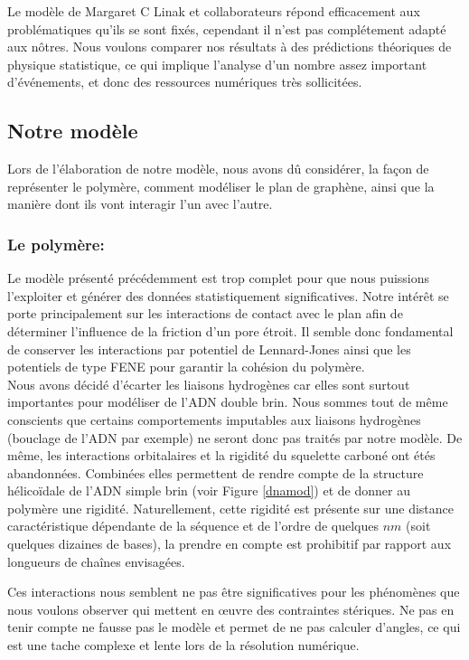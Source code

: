 \documentclass[a4paper,11pt]{article}
\begin{document}
Le modèle de Margaret C Linak et collaborateurs \cite{jchem} répond efficacement aux problématiques qu'ils se sont fixés, cependant il n'est pas complétement adapté aux nôtres. Nous voulons comparer nos résultats à des prédictions théoriques de physique statistique, ce qui implique l'analyse d'un nombre assez important d'événements, et donc des ressources numériques très sollicitées.\\

\subsection{Notre modèle}

Lors de l'élaboration de notre modèle, nous avons dû considérer, la façon de représenter le polymère, comment modéliser le plan de graphène, ainsi que la manière dont ils vont interagir l'un avec l'autre.

\subsubsection*{Le polymère:}

Le modèle présenté précédemment est trop complet pour que nous puissions l'exploiter et générer des données statistiquement significatives. Notre intérêt se porte principalement sur les interactions de contact avec le plan afin de déterminer l'influence de la friction d'un pore étroit. Il semble donc fondamental de conserver les interactions par potentiel de Lennard-Jones ainsi que les potentiels de type FENE pour garantir la cohésion du polymère.\\

Nous avons décidé d'écarter les liaisons hydrogènes car elles sont surtout importantes pour modéliser de l'ADN double brin. Nous sommes tout de même conscients que certains comportements imputables aux liaisons hydrogènes (bouclage de l'ADN par exemple) ne seront donc pas traités par notre modèle. De même, les interactions orbitalaires et la rigidité du squelette carboné ont étés abandonnées. Combinées elles permettent de rendre compte de la structure hélicoïdale de l'ADN simple brin (voir Figure \ref{dnamod}) et de donner au polymère une rigidité. Naturellement, cette rigidité est présente sur une distance caractéristique dépendante de la séquence et de l'ordre de quelques $nm$ (soit quelques dizaines de bases), la prendre en compte est prohibitif par rapport aux longueurs de chaînes envisagées.

Ces interactions nous semblent ne pas être significatives pour les phénomènes que nous voulons observer qui mettent en œuvre des contraintes stériques. Ne pas en tenir compte ne fausse pas le modèle et permet de ne pas calculer d'angles, ce qui est une tache complexe et lente lors de la résolution numérique.\\
\end{document}
